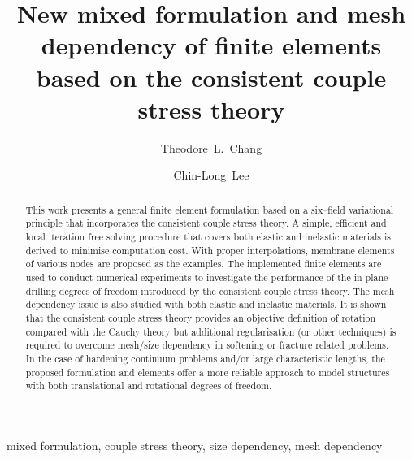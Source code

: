 \documentclass[3p,sort&compress,11pt,fleqn,review]{elsarticle}
\begin{document}
\begin{abstract}
This work presents a general finite element formulation based on a six--field variational principle that incorporates the consistent couple stress theory. A simple, efficient and local iteration free solving procedure that covers both elastic and inelastic materials is derived to minimise computation cost. With proper interpolations, membrane elements of various nodes are proposed as the examples. The implemented finite elements are used to conduct numerical experiments to investigate the performance of the in-plane drilling degrees of freedom introduced by the consistent couple stress theory. The mesh dependency issue is also studied with both elastic and inelastic materials. It is shown that the consistent couple stress theory provides an objective definition of rotation compared with the Cauchy theory but additional regularisation (or other techniques) is required to overcome mesh/size dependency in softening or fracture related problems. In the case of hardening continuum problems and/or large characteristic lengths, the proposed formulation and elements offer a more reliable approach to model structures with both translational and rotational degrees of freedom.
\end{abstract}
\begin{keyword}
mixed formulation\sep
couple stress theory\sep
size dependency\sep
mesh dependency
\end{keyword}
\begin{frontmatter}
\title{New mixed formulation and mesh dependency of finite elements based on the consistent couple stress theory}
\author[]{Theodore~L.~Chang}
\author[]{Chin-Long~Lee}
\address{Department of Civil and Natural Resources Engineering, University of Canterbury, Christchurch, New Zealand, 8041.}
\end{frontmatter}
\end{document}
